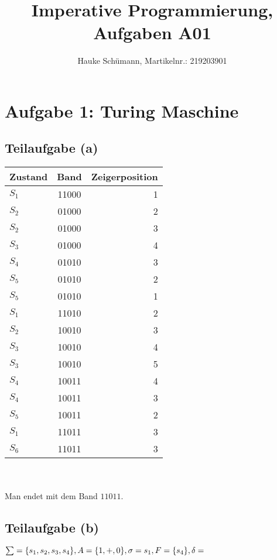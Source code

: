 \documentclass[11pt]{article} %
\title{Imperative Programmierung, Aufgaben A01}
\author{Hauke Schümann, Martikelnr.: 219203901}
\begin{document}
\maketitle

\section{Aufgabe 1: Turing Maschine}

\subsection{Teilaufgabe (a)}
\begin{large}
\begin{tabular}{|l|c|r|}
\hline
Zustand & Band & Zeigerposition\\\hline
$S_1$ & 11000 & 1\\\hline
$S_2$ & 01000 & 2\\\hline
$S_2$ & 01000 & 3\\\hline
$S_3$ & 01000 & 4\\\hline
$S_4$ & 01010 & 3\\\hline
$S_5$ & 01010 & 2\\\hline
$S_5$ & 01010 & 1\\\hline
$S_1$ & 11010 & 2\\\hline
$S_2$ & 10010 & 3\\\hline
$S_3$ & 10010 & 4\\\hline
$S_3$ & 10010 & 5\\\hline
$S_4$ & 10011 & 4\\\hline
$S_4$ & 10011 & 3\\\hline
$S_5$ & 10011 & 2\\\hline
$S_1$ & 11011 & 3\\\hline
$S_6$ & 11011 & 3\\\hline
\end{tabular}
\end{large}
\\\\
Man endet mit dem Band $11011$.

\subsection{Teilaufgabe (b)}

$
\sum = \{s_1,s_2,s_3,s_4\}, \\
 A = \{1,+,0\}, \\
\sigma = s_1, \\
F = \{s_4\}, \\
\delta =$
\end{document}
